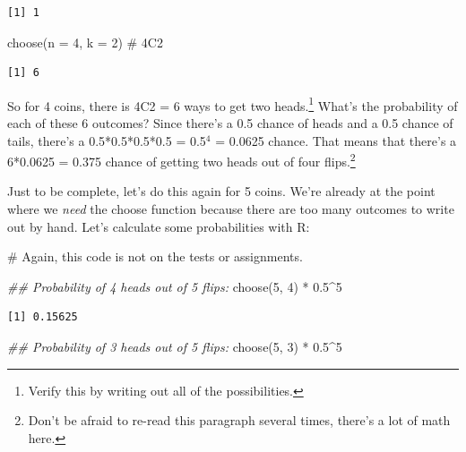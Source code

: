 \documentclass[
  letterpaper,
  DIV=11,
  numbers=noendperiod,
  oneside]{scrreprt}
\newenvironment{Shaded}{\begin{snugshade}}{\end{snugshade}}
\newcommand{\AttributeTok}[1]{\textcolor[rgb]{0.40,0.45,0.13}{#1}}
\newcommand{\CommentTok}[1]{\textcolor[rgb]{0.37,0.37,0.37}{#1}}
\newcommand{\DecValTok}[1]{\textcolor[rgb]{0.68,0.00,0.00}{#1}}
\newcommand{\DocumentationTok}[1]{\textcolor[rgb]{0.37,0.37,0.37}{\textit{#1}}}
\newcommand{\FloatTok}[1]{\textcolor[rgb]{0.68,0.00,0.00}{#1}}
\newcommand{\FunctionTok}[1]{\textcolor[rgb]{0.28,0.35,0.67}{#1}}
\newcommand{\NormalTok}[1]{\textcolor[rgb]{0.00,0.23,0.31}{#1}}
\newcommand{\SpecialCharTok}[1]{\textcolor[rgb]{0.37,0.37,0.37}{#1}}
\begin{document}
\begin{verbatim}
[1] 1
\end{verbatim}

\begin{Shaded}
\begin{Highlighting}[]
\FunctionTok{choose}\NormalTok{(}\AttributeTok{n =} \DecValTok{4}\NormalTok{, }\AttributeTok{k =} \DecValTok{2}\NormalTok{) }\CommentTok{\# 4C2}
\end{Highlighting}
\end{Shaded}

\begin{verbatim}
[1] 6
\end{verbatim}

So for 4 coins, there is 4C2 = 6 ways to get two heads.\footnote{Verify
  this by writing out all of the possibilities.} What's the probability
of each of these 6 outcomes? Since there's a 0.5 chance of heads and a
0.5 chance of tails, there's a 0.5*0.5*0.5*0.5 = 0.5\(^4\) = 0.0625
chance. That means that there's a 6*0.0625 = 0.375 chance of getting two
heads out of four flips.\footnote{Don't be afraid to re-read this
  paragraph several times, there's a lot of math here.}

Just to be complete, let's do this again for 5 coins. We're already at
the point where we \emph{need} the choose function because there are too
many outcomes to write out by hand. Let's calculate some probabilities
with R:

\begin{Shaded}
\begin{Highlighting}[]
\CommentTok{\# Again, this code is not on the tests or assignments.}

\DocumentationTok{\#\# Probability of 4 heads out of 5 flips:}
\FunctionTok{choose}\NormalTok{(}\DecValTok{5}\NormalTok{, }\DecValTok{4}\NormalTok{) }\SpecialCharTok{*} \FloatTok{0.5}\SpecialCharTok{\^{}}\DecValTok{5}
\end{Highlighting}
\end{Shaded}

\begin{verbatim}
[1] 0.15625
\end{verbatim}

\begin{Shaded}
\begin{Highlighting}[]
\DocumentationTok{\#\# Probability of 3 heads out of 5 flips:}
\FunctionTok{choose}\NormalTok{(}\DecValTok{5}\NormalTok{, }\DecValTok{3}\NormalTok{) }\SpecialCharTok{*} \FloatTok{0.5}\SpecialCharTok{\^{}}\DecValTok{5}
\end{Highlighting}
\end{Shaded}
\end{document}
